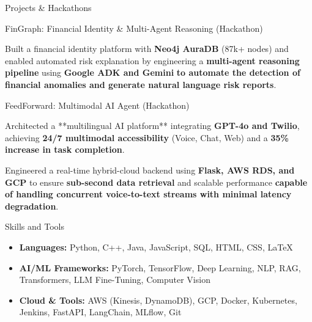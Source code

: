 \documentclass{resume} %
\begin{document}
\begin{rSection}{Projects \& Hackathons \vspace{.1em}}
\begin{rSubsection}{FinGraph: Financial Identity \& Multi-Agent Reasoning (Hackathon)}{}{}{}
\begin{itemize}[left=-1.5em, labelsep=.1cm, labelwidth=.2cm, itemsep=0.0em]
{\item Built a financial identity platform with \textbf{Neo4j AuraDB} (87k+ nodes) and enabled automated risk explanation by engineering a \textbf{multi-agent reasoning pipeline} using \textbf{Google ADK and Gemini} \textbf{to automate the detection of financial anomalies and generate natural language risk reports}.}
\end{itemize}
\end{rSubsection}

\begin{rSubsection}{FeedForward: Multimodal AI Agent (Hackathon)}{}{}{}
\begin{itemize}[left=-1.5em, labelsep=.1cm, labelwidth=.2cm, itemsep=0.0em]
{\item Architected a **multilingual AI platform** integrating \textbf{GPT-4o and Twilio}, achieving \textbf{24/7 multimodal accessibility} (Voice, Chat, Web) and a \textbf{35\% increase in task completion}.}
{\item Engineered a real-time hybrid-cloud backend using \textbf{Flask, AWS RDS, and GCP} to ensure \textbf{sub-second data retrieval} and scalable performance \textbf{capable of handling concurrent voice-to-text streams with minimal latency degradation}.}
\end{itemize}
\end{rSubsection}

\end{rSection}

\begin{rSection}{Skills and Tools}

\begin{itemize}[left=-1.5em, labelsep=.1cm, labelwidth=.2cm, itemsep=0.0em]
    \item \textbf{Languages:} Python, C++, Java, JavaScript, SQL, HTML, CSS, LaTeX
    \item \textbf{AI/ML Frameworks:} PyTorch, TensorFlow, Deep Learning, NLP, RAG, Transformers, LLM Fine-Tuning, Computer Vision
    \item \textbf{Cloud \& Tools:} AWS (Kinesis, DynamoDB), GCP, Docker, Kubernetes, Jenkins, FastAPI, LangChain, MLflow, Git
\end{itemize}

\end{rSection}
\end{document}
